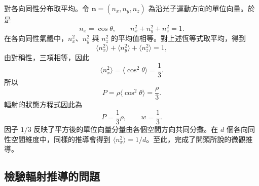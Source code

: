 對各向同性分布取平均。令 \(\mathbf n=(n_x,n_y,n_z)\) 為沿光子運動方向的單位向量。於是
\begin{equation}
n_x=\cos\theta,
\qquad
n_x^2+n_y^2+n_z^2=1.
\end{equation}
在各向同性氣體中，\(n_x^2\)、\(n_y^2\) 與 \(n_z^2\) 的平均值相等。對上述恆等式取平均，得到
\begin{equation}
\langle n_x^2\rangle+\langle n_y^2\rangle+\langle n_z^2\rangle=1,
\end{equation}
由對稱性，三項相等，因此
\begin{equation}
\langle n_x^2\rangle=\langle \cos^2\theta\rangle=\frac13.
\end{equation}
所以
\begin{equation}
P=\rho\langle \cos^2\theta\rangle=\frac{\rho}{3}.
\end{equation}
輻射的狀態方程式因此為
\begin{equation}
P=\frac13\rho,
\qquad
w=\frac13.
\end{equation}
因子 \(1/3\) 反映了平方後的單位向量分量由各個空間方向共同分攤。在 \(d\) 個各向同性空間維度中，同樣的推導會得到 \(\langle n_x^2\rangle=1/d\)。至此，完成了開頭所說的微觀推導。

\subsection{檢驗輻射推導的問題}

\begin{classroomqa}
\end{classroomqa}

\begin{classroomqa}
\end{classroomqa}

\begin{classroomqa}
\end{classroomqa}

